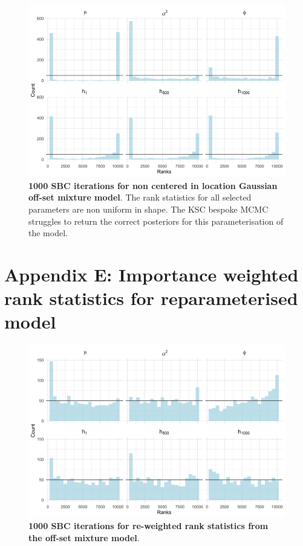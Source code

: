 \documentclass[12pt, a4paper]{article}
\begin{document}
    \begin{figure}[H]
        \centering
        \includegraphics[scale=0.09]{results/ksc_ncp_1k.png}
        \caption{\textbf{1000 SBC iterations for non centered in location Gaussian off-set mixture model}. The rank statistics for all selected parameters are non uniform in shape. The KSC bespoke MCMC struggles to return the correct posteriors for this parameterisation of the model.}
        \label{fig:ncpksc1k}
    \end{figure}
    
\section{Appendix E: Importance weighted rank statistics for reparameterised model}

\begin{figure}[H]
        \centering
        \includegraphics[scale=0.09]{results/weighted_ksc_cp_1k.png}
        \caption{\textbf{1000 SBC iterations for re-weighted rank statistics from the off-set mixture model}.}
        \label{fig:reweight1k}
    \end{figure}
\end{document}
